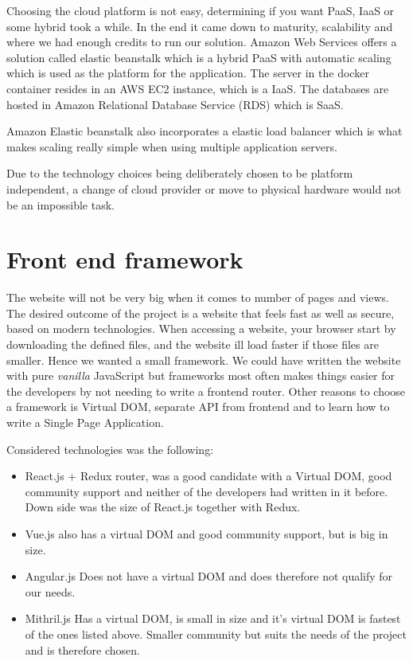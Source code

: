 \documentclass[12pt,a4paper]{report}
\begin{document}
Choosing the cloud platform is not easy, determining if you want PaaS, IaaS or some hybrid took a while. In the end it came down to maturity, scalability and where we had enough credits to run our solution. Amazon Web Services offers a solution called elastic beanstalk which is a hybrid PaaS with automatic scaling which is used as the platform for the application. The server in the docker container resides in an AWS EC2 instance, which is a IaaS. The databases are hosted in Amazon Relational Database Service (RDS) which is SaaS. 

Amazon Elastic beanstalk also incorporates a elastic load balancer which is what makes scaling really simple when using multiple application servers. 

Due to the technology choices being deliberately chosen to be platform independent, a change of cloud provider or move to physical hardware would not be an impossible task.
\section{Front end framework}
The website will not be very big when it comes to number of pages and views.
The desired outcome of the project is a website that feels fast as well as secure, based on modern technologies. When accessing a website, your browser start by downloading the defined files, and the website ill load faster if those files are smaller. Hence we wanted a small framework.
We could have written the website with pure \textit{vanilla} JavaScript but frameworks most often makes things easier for the developers by not needing to write a frontend router. Other reasons to choose a framework is Virtual DOM, separate API from frontend and to learn how to write a Single Page Application.

Considered technologies was the following:
\begin{itemize}
    \item React.js + Redux router, was a good candidate with a Virtual DOM, good community support and neither of the developers had written in it before. Down side was the size of React.js together with Redux.
    \item Vue.js also has a virtual DOM and good community support, but is big in size.
    \item Angular.js Does not have a virtual DOM and does therefore not qualify for our needs.
    \item Mithril.js Has a virtual DOM, is small in size and it's virtual DOM is fastest of the ones listed above. Smaller community but suits the needs of the project and is therefore chosen.
\end{itemize}
\end{document}
